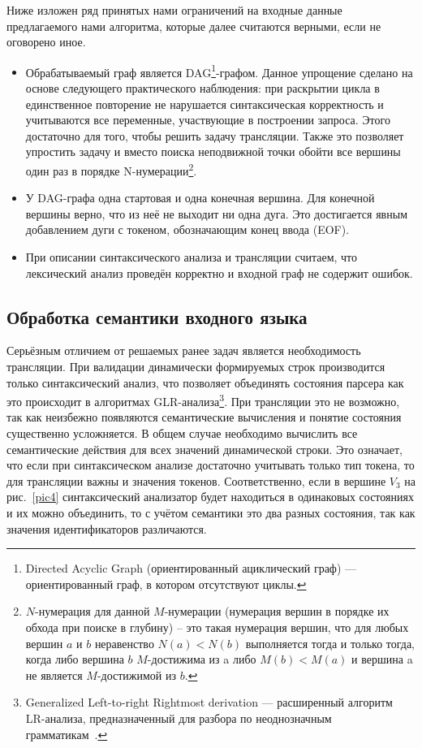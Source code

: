 \documentclass[a5paper]{article}
\begin{document}
	Ниже изложен ряд принятых нами ограничений на входные данные предлагаемого нами алгоритма, которые далее считаются верными, если не оговорено иное.
	\begin{itemize}
        \item Обрабатываемый граф является DAG\footnote{Directed Acyclic Graph (ориентированный ациклический граф) —  ориентированный граф, в котором отсутствуют циклы.}-графом. Данное упрощение сделано на основе следующего практического наблюдения: при раскрытии цикла в единственное повторение не нарушается синтаксическая корректность и учитываются все переменные, участвующие в построении запроса. Этого достаточно для того, чтобы решить задачу трансляции. Также это  позволяет упростить задачу и вместо поиска неподвижной точки обойти все вершины один раз в порядке N-нумерации\footnote{$N$-нумерация для данной $M$-нумерации (нумерация вершин в порядке их обхода при поиске в глубину) -- это такая нумерация  вершин, что для любых вершин  $a$ и $b$ неравенство $N(a)<N(b)$ выполняется тогда и только тогда, когда либо вершина $b$ $M$-достижима из a либо $M(b)<M(a)$  и вершина a не является $M$-достижимой из $b$. }.
        \item У DAG-графа одна стартовая и одна конечная вершина. Для конечной вершины верно, что из неё не выходит ни одна дуга. Это достигается явным добавлением дуги с токеном, обозначающим конец ввода (EOF).
        \item При описании синтаксического анализа и трансляции считаем, что лексический анализ проведён корректно и входной граф не содержит ошибок.
    \end{itemize}


\subsection{Обработка семантики входного языка}

Серьёзным отличием от решаемых ранее задач является необходимость трансляции. При валидации динамически формируемых строк производится только синтаксический анализ, что позволяет объединять состояния парсера как это происходит в алгоритмах GLR-анализа\footnote{Generalized Left-to-right Rightmost derivation —  расширенный алгоритм LR-анализа, предназначенный для разбора по неоднозначным грамматикам~\cite{Grune}.}. При трансляции это не возможно, так как неизбежно появляются семантические вычисления и понятие состояния существенно усложняется. В общем случае необходимо вычислить все семантические действия для всех значений динамической строки. Это означает, что если при синтаксическом анализе достаточно учитывать только тип токена, то для трансляции важны и значения токенов. Соответственно, если в вершине $V_3$ на рис.~\ref{pic4} синтаксический анализатор будет находиться в одинаковых состояниях и их можно объединить, то с учётом семантики это два разных состояния, так как значения идентификаторов различаются.
\end{document}
